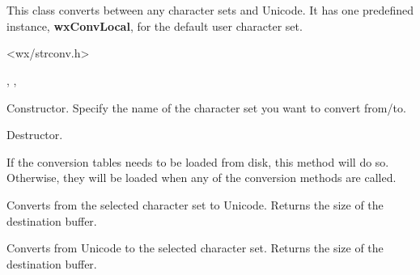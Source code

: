 %
%


\section{}\label{wxcsconv}

This class converts between any character sets and Unicode.
It has one predefined instance, {\bf wxConvLocal}, for the
default user character set.




<wx/strconv.h>


, 
, 



\label{wxcsconvwxcsconv}


Constructor. Specify the name of the character set you want to convert
from/to.

\label{wxcsconvdtor}


Destructor.

\label{wxcsconvloadnow}


If the conversion tables needs to be loaded from disk, this method
will do so. Otherwise, they will be loaded when any of the conversion
methods are called.

\label{wxcsconvmb2wc}


Converts from the selected character set to Unicode. Returns the size of the destination buffer.

\label{wxcsconvwc2mb}


Converts from Unicode to the selected character set. Returns the size of the destination buffer.
